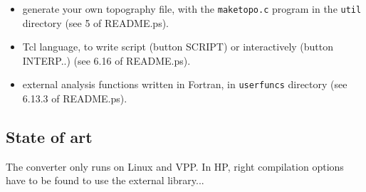 \begin{itemize}
\item generate your own topography file, with the {\tt maketopo.c} program
in the {\tt util} directory (see 5 of README.ps).

\item Tcl language, to write script (button {\sf SCRIPT}) or
interactively (button {\sf INTERP..}) (see 6.16 of README.ps).

\item external analysis functions written in Fortran,
in {\tt userfuncs} directory (see 6.13.3 of README.ps).

\end{itemize}

\subsection{State of art}
The converter only runs on Linux and VPP.
In HP, right compilation options have to be found to use the external library...
